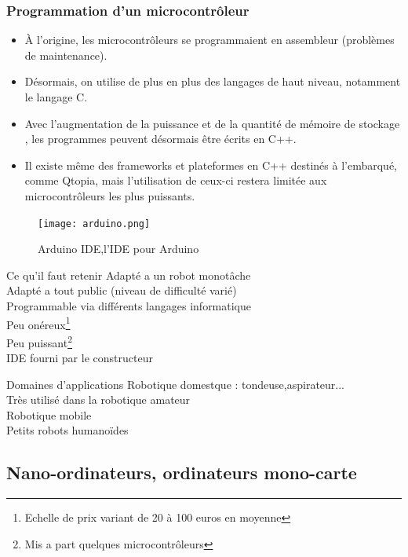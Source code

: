 \documentclass{beamer}
\begin{document}
\begin{frame}
\frametitle{Programmation d'un microcontrôleur}
\begin{itemize}
\item À l'origine, les microcontrôleurs se programmaient en assembleur (problèmes de maintenance).
\item Désormais, on utilise de plus en plus des langages de haut niveau, notamment le langage C.
\item Avec l’augmentation de la puissance et de la quantité de mémoire de stockage , les programmes  peuvent désormais être écrits en C++. 
\item Il existe même des frameworks et plateformes en C++ destinés à l’embarqué, comme Qtopia, mais l'utilisation de ceux-ci restera limitée aux microcontrôleurs les plus puissants. 
\end{itemize}
\end{frame}
\begin{frame}
\begin{figure}[!h]
\centering
\texttt{[image: arduino.png]}
\caption{Arduino IDE,l'IDE pour Arduino}
\end{figure}
\end{frame}
\begin{frame}
\begin{alertblock}{Ce qu'il faut retenir}
Adapté a un robot monotâche\\
Adapté a tout public (niveau de difficulté varié)\\
Programmable via différents langages informatique\\
Peu onéreux\footnote{Echelle de prix variant de 20 à 100 euros en moyenne}\\
Peu puissant\footnote{Mis a part quelques microcontrôleurs}\\
IDE fourni par le constructeur
\end{alertblock}
\begin{exampleblock}{Domaines d'applications}
Robotique domestque : tondeuse,aspirateur...\\
Très utilisé dans la robotique amateur \\
Robotique mobile\\
Petits robots humanoïdes
\end{exampleblock}
\end{frame}

\subsection{Nano-ordinateurs, ordinateurs mono-carte}
\end{document}
